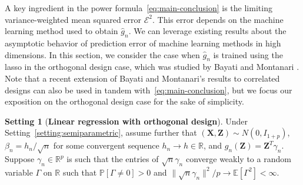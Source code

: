\documentclass[12pt]{article}
\theoremstyle{definition}
\newtheorem{setting}{Setting}
\theoremstyle{remark}
\newcommand{\prx}{\bm X}
\newcommand{\prz}{\bm Z}
\begin{document}
A key ingredient in the power formula~\eqref{eq:main-conclusion} is the limiting variance-weighted mean squared error $\mathcal E^2$. This error depends on the machine learning method used to obtain $\widehat g_n$. We can leverage existing results about the asymptotic behavior of prediction error of machine learning methods in high dimensions. In this section, we consider the case when $\widehat g_n$ is trained using the lasso in the orthogonal design case, which was studied by Bayati and Montanari \cite{Bayati2011}. Note that a recent extension of Bayati and Montanari's results to correlated designs \cite{Celentano2020} can also be used in tandem with~\eqref{eq:main-conclusion}, but we focus our exposition on the orthogonal design case for the sake of simplicity.

\begin{setting}[\bf Linear regression with orthogonal design] \label{setting:orthogonal-design}
Under Setting~\ref{setting:semiparametric}, assume further that $(\prx, \prz) \sim N(0, I_{1+p})$, $\beta_n = h_n/\sqrt{n}$ for some convergent sequence $h_n \rightarrow h \in \mathbb R$, and $g_n(\prz) = \prz^T \gamma_n$. Suppose $\gamma_n \in \mathbb R^p$ is such that the entries of $\sqrt n \gamma_n$ converge weakly to a random variable $\Gamma$ on $\mathbb R$ such that $\mathbb P[\Gamma \neq 0] > 0$ and $\|\sqrt n \gamma_n\|^2/p \rightarrow \mathbb E[\Gamma^2] < \infty$.
\end{setting}
\end{document}
